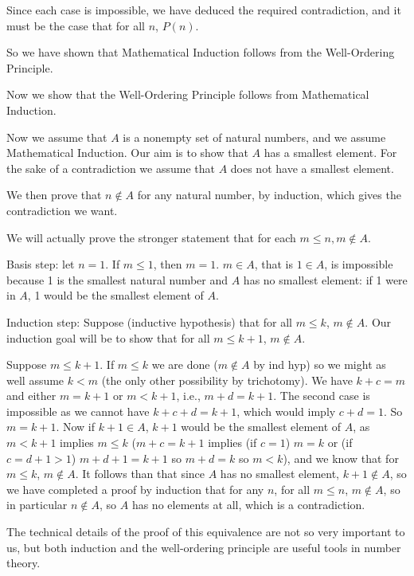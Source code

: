 \documentclass[12pt]{article}
\begin{document}
Since each case is impossible, we have deduced the required contradiction, and it must be the case that for all $n$, $P(n)$.

So we have shown that Mathematical Induction follows from the Well-Ordering Principle.

Now we show that the Well-Ordering Principle follows from Mathematical Induction.

Now we assume that $A$ is a nonempty set of natural numbers, and we assume Mathematical Induction.   Our aim is to show that $A$ has a smallest element.  For the sake of a contradiction we assume that $A$ does not have a smallest element. 

We then prove that $n \not\in A$ for any natural number, by induction, which gives the contradiction we want.

We will actually prove the stronger statement that for each $m \leq n, m \not\in A$.%

Basis step:  let $n=1$.  If $m \leq 1$, then $m=1$.   $m \in A$, that is $1 \in A$, is impossible because
1 is the smallest natural number and $A$ has no smallest element:  if 1 were in $A$, 1 would be the smallest element of $A$.

Induction step:  Suppose (inductive hypothesis) that for all $m \leq k$, $m \not\in A$.  Our induction goal will be to show
that for all $m \leq k+1$, $m \not\in A$.

Suppose $m \leq k+1$.   If $m \leq k$ we are done ($m \not\in A$ by ind hyp) so we might as well assume
$k<m$ (the only other possibility by trichotomy).  We have $k+c=m$ and either $m=k+1$ or $m<k+1$, i.e., $m+d=k+1$.
The second case is impossible as we cannot have $k+c+d=k+1$, which would imply $c+d=1$.  So $m=k+1$.
Now if $k+1\in A$, $k+1$ would be the smallest element of $A$, as $m<k+1$ implies $m \leq k$ ($m+c=k+1$
implies (if $c=1$) $m=k$ or (if $c=d+1>1$) $m+d+1=k+1$ so $m+d=k$ so $m < k$), and we know that for $m \leq k$, $m \not\in A$.  It follows than that since $A$ has no smallest element, $k+1 \not\in A$, so we have completed a proof by induction that for any $n$, for all $m \leq n$, $m \not\in A$, so in particular $n \not\in A$, so $A$ has no elements at all, which is a contradiction.

The technical details of the proof of this equivalence are not so very important to us, but both induction and the well-ordering principle are useful tools in number theory.

\newpage
\end{document}
